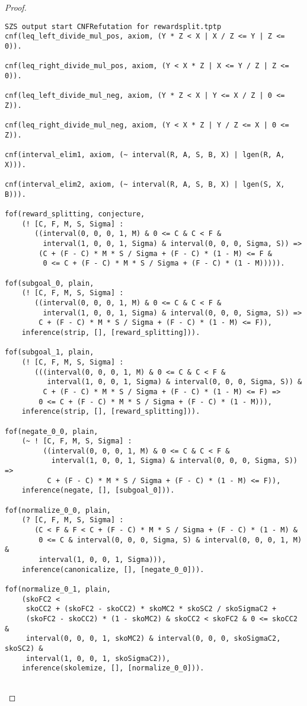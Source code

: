 \begin{proof}
  \ifproofs
\begin{verbatim}
SZS output start CNFRefutation for rewardsplit.tptp
cnf(leq_left_divide_mul_pos, axiom, (Y * Z < X | X / Z <= Y | Z <= 0)).

cnf(leq_right_divide_mul_pos, axiom, (Y < X * Z | X <= Y / Z | Z <= 0)).

cnf(leq_left_divide_mul_neg, axiom, (Y * Z < X | Y <= X / Z | 0 <= Z)).

cnf(leq_right_divide_mul_neg, axiom, (Y < X * Z | Y / Z <= X | 0 <= Z)).

cnf(interval_elim1, axiom, (~ interval(R, A, S, B, X) | lgen(R, A, X))).

cnf(interval_elim2, axiom, (~ interval(R, A, S, B, X) | lgen(S, X, B))).

fof(reward_splitting, conjecture,
    (! [C, F, M, S, Sigma] :
       ((interval(0, 0, 0, 1, M) & 0 <= C & C < F &
         interval(1, 0, 0, 1, Sigma) & interval(0, 0, 0, Sigma, S)) =>
        (C + (F - C) * M * S / Sigma + (F - C) * (1 - M) <= F &
         0 <= C + (F - C) * M * S / Sigma + (F - C) * (1 - M))))).

fof(subgoal_0, plain,
    (! [C, F, M, S, Sigma] :
       ((interval(0, 0, 0, 1, M) & 0 <= C & C < F &
         interval(1, 0, 0, 1, Sigma) & interval(0, 0, 0, Sigma, S)) =>
        C + (F - C) * M * S / Sigma + (F - C) * (1 - M) <= F)),
    inference(strip, [], [reward_splitting])).

fof(subgoal_1, plain,
    (! [C, F, M, S, Sigma] :
       (((interval(0, 0, 0, 1, M) & 0 <= C & C < F &
          interval(1, 0, 0, 1, Sigma) & interval(0, 0, 0, Sigma, S)) &
         C + (F - C) * M * S / Sigma + (F - C) * (1 - M) <= F) =>
        0 <= C + (F - C) * M * S / Sigma + (F - C) * (1 - M))),
    inference(strip, [], [reward_splitting])).

fof(negate_0_0, plain,
    (~ ! [C, F, M, S, Sigma] :
         ((interval(0, 0, 0, 1, M) & 0 <= C & C < F &
           interval(1, 0, 0, 1, Sigma) & interval(0, 0, 0, Sigma, S)) =>
          C + (F - C) * M * S / Sigma + (F - C) * (1 - M) <= F)),
    inference(negate, [], [subgoal_0])).

fof(normalize_0_0, plain,
    (? [C, F, M, S, Sigma] :
       (C < F & F < C + (F - C) * M * S / Sigma + (F - C) * (1 - M) &
        0 <= C & interval(0, 0, 0, Sigma, S) & interval(0, 0, 0, 1, M) &
        interval(1, 0, 0, 1, Sigma))),
    inference(canonicalize, [], [negate_0_0])).

fof(normalize_0_1, plain,
    (skoFC2 <
     skoCC2 + (skoFC2 - skoCC2) * skoMC2 * skoSC2 / skoSigmaC2 +
     (skoFC2 - skoCC2) * (1 - skoMC2) & skoCC2 < skoFC2 & 0 <= skoCC2 &
     interval(0, 0, 0, 1, skoMC2) & interval(0, 0, 0, skoSigmaC2, skoSC2) &
     interval(1, 0, 0, 1, skoSigmaC2)),
    inference(skolemize, [], [normalize_0_0])).


\end{verbatim}
\end{proof}
